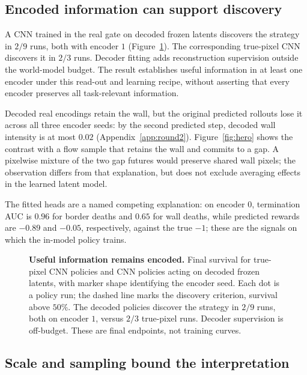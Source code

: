 \subsection{Encoded information can support discovery}
\label{sec:results-wall}

A CNN trained in the real gate on decoded frozen latents discovers the strategy in $2/9$ runs,
both with encoder $1$ (Figure~\ref{fig:discovery}). The corresponding true-pixel CNN discovers it in
$2/3$ runs. Decoder fitting adds reconstruction supervision outside the world-model budget.
The result establishes useful information in at least one encoder under this read-out and learning
recipe, without asserting that every encoder preserves all task-relevant information.

Decoded real encodings retain the wall, but the original predicted rollouts lose it across all
three encoder seeds: by the second predicted step, decoded wall intensity is at most $0.02$
(Appendix~\ref{app:round2}). Figure~\ref{fig:hero} shows the contrast with a flow sample that retains
the wall and commits to a gap. A pixelwise mixture of the two gap futures would preserve shared
wall pixels; the observation differs from that explanation, but does not exclude averaging effects
in the learned latent model.

The fitted heads are a named competing explanation: on encoder $0$, termination AUC is $0.96$
for border deaths and $0.65$ for wall deaths, while predicted rewards are $-0.89$ and $-0.05$,
respectively, against the true $-1$; these are the signals on which the in-model policy trains.

\begin{figure}[t]
\centering
\renewcommand{\figureheight}{1.40in}
\caption{\textbf{Useful information remains encoded.} Final survival for true-pixel CNN policies and
CNN policies acting on decoded frozen latents, with marker shape identifying the encoder seed. Each dot is a policy run;
the dashed line marks the discovery criterion, survival above $50\%$. The decoded policies discover
the strategy in $2/9$ runs, both on encoder $1$, versus $2/3$ true-pixel runs. Decoder supervision is
off-budget. These are final endpoints, not training curves.}
\label{fig:discovery}
\end{figure}

\subsection{Scale and sampling bound the interpretation}
\label{sec:results-mean}

